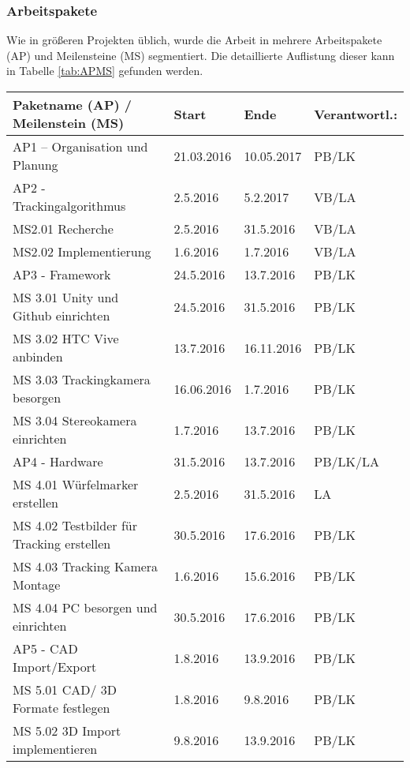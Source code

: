 \subsubsection{Arbeitspakete}
Wie in größeren Projekten üblich, wurde die Arbeit in mehrere Arbeitspakete (AP) und Meilensteine (MS) segmentiert. Die detaillierte Auflistung dieser kann in Tabelle \ref{tab:APMS} gefunden werden.
\begin{table}
	\centering
	\begin{tabular}{|l|l|l|l|}
		\hline
		\Absatzbox{}
		\textbf{Paketname (AP) / Meilenstein (MS)}& \textbf{Start} &  \textbf{Ende} &  \textbf{Verantwortl.:} \\
		\hline
		AP1 – Organisation und Planung & 21.03.2016 & 10.05.2017 & PB/LK\\		
  		\hline
		AP2 - Trackingalgorithmus & 2.5.2016 & 5.2.2017 & VB/LA\\
		\hline
		MS2.01 Recherche  & 2.5.2016 & 31.5.2016 & VB/LA\\
 	 	\hline
		MS2.02 Implementierung  & 1.6.2016 & 1.7.2016 & VB/LA\\
		\hline
		AP3 - Framework  & 24.5.2016 & 13.7.2016 & PB/LK\\
		\hline
		MS 3.01 Unity und Github einrichten  & 24.5.2016 & 31.5.2016 & PB/LK\\
		\hline
		MS 3.02 HTC Vive anbinden & 13.7.2016 & 16.11.2016 & PB/LK\\
		\hline
		MS 3.03 Trackingkamera besorgen &16.06.2016 & 1.7.2016 & PB/LK\\
		\hline
		MS  3.04 Stereokamera einrichten &1.7.2016 & 13.7.2016 & PB/LK\\
		\hline
		AP4 - Hardware & 31.5.2016 & 13.7.2016 & PB/LK/LA\\
		\hline
		MS 4.01 Würfelmarker erstellen & 2.5.2016 & 31.5.2016 & LA\\
		\hline
		MS 4.02 Testbilder für Tracking erstellen  & 30.5.2016 & 17.6.2016 & PB/LK\\
		\hline
		MS 4.03 Tracking Kamera Montage	& 1.6.2016 & 15.6.2016 & PB/LK\\
		\hline
		MS 4.04 PC besorgen und einrichten & 30.5.2016 & 17.6.2016 & PB/LK\\
		\hline
		AP5 - CAD Import/Export & 1.8.2016 & 13.9.2016 & PB/LK\\
		\hline
		MS 5.01 CAD/ 3D Formate festlegen & 1.8.2016 & 9.8.2016 & PB/LK\\
		\hline
		MS 5.02 3D Import implementieren & 9.8.2016 & 13.9.2016 & PB/LK\\

\end{tabular}
\end{table}
